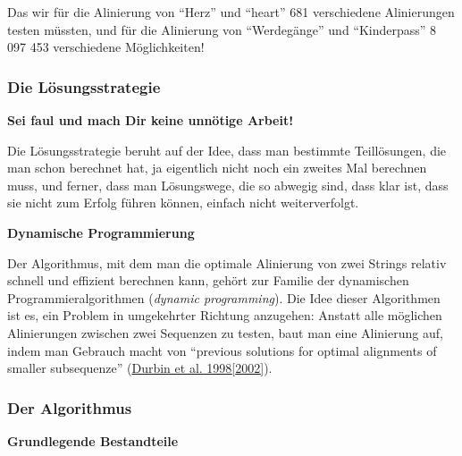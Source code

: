 Das wir für die Alinierung von ``Herz'' und ``heart'' 681 verschiedene
Alinierungen testen müssten, und für die Alinierung von ``Werdegänge''
und ``Kinderpass'' 8 097 453 verschiedene Möglichkeiten!



\subsubsection{\texorpdfstring{{Die
Lösungsstrategie}}{Die Lösungsstrategie}}

\vspace{0.5cm}\par\noindent\textbf{Sei faul und mach Dir keine unnötige Arbeit!}\vspace{0.5cm}

Die Lösungsstrategie beruht auf der Idee, dass man bestimmte
Teillösungen, die man schon berechnet hat, ja eigentlich nicht noch ein
zweites Mal berechnen muss, und ferner, dass man Lösungswege, die so
abwegig sind, dass klar ist, dass sie nicht zum Erfolg führen können,
einfach nicht weiterverfolgt.




\vspace{0.5cm}\par\noindent\textbf{Dynamische Programmierung}\vspace{0.5cm}

Der Algorithmus, mit dem man die optimale Alinierung von zwei Strings
relativ schnell und effizient berechnen kann, gehört zur Familie der
dynamischen Programmieralgorithmen (\emph{dynamic programming}). Die
Idee dieser Algorithmen ist es, ein Problem in umgekehrter Richtung
anzugehen: Anstatt alle möglichen Alinierungen zwischen zwei Sequenzen
zu testen, baut man eine Alinierung auf, indem man Gebrauch macht von
``previous solutions for optimal alignments of smaller subsequenze''
(\href{http://bibliography.lingpy.org?key=Durbin2002}{Durbin et al.
1998{[}2002{]}}).



\subsubsection{Der Algorithmus}

\vspace{0.5cm}\par\noindent\textbf{Grundlegende Bestandteile}\vspace{0.5cm}

